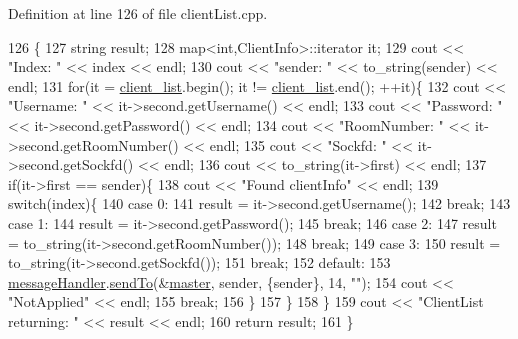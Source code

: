 Definition at line 126 of file client\+List.\+cpp.


\begin{DoxyCode}
126                                                      \{
127     \textcolor{keywordtype}{string} result;
128     map<int,ClientInfo>::iterator it;
129     cout << \textcolor{stringliteral}{"Index: "} << index << endl;
130     cout << \textcolor{stringliteral}{"sender: "} << to\_string(sender) << endl;
131     \textcolor{keywordflow}{for}(it = \hyperlink{class_client_list_a53c73362bff032aa6fceab4b8b5b39de}{client\_list}.begin(); it != \hyperlink{class_client_list_a53c73362bff032aa6fceab4b8b5b39de}{client\_list}.end(); ++it)\{
132         cout << \textcolor{stringliteral}{"Username: "} << it->second.getUsername() << endl;
133         cout << \textcolor{stringliteral}{"Password: "} << it->second.getPassword() << endl;
134         cout << \textcolor{stringliteral}{"RoomNumber: "} << it->second.getRoomNumber() << endl;
135         cout << \textcolor{stringliteral}{"Sockfd: "} << it->second.getSockfd() << endl;
136         cout << to\_string(it->first) << endl;
137         \textcolor{keywordflow}{if}(it->first == sender)\{
138             cout << \textcolor{stringliteral}{"Found clientInfo"} << endl;
139             \textcolor{keywordflow}{switch}(index)\{
140                 \textcolor{keywordflow}{case} 0:
141                     result = it->second.getUsername();
142                     \textcolor{keywordflow}{break};
143                 \textcolor{keywordflow}{case} 1:
144                     result = it->second.getPassword();
145                     \textcolor{keywordflow}{break};  
146                 \textcolor{keywordflow}{case} 2:
147                     result = to\_string(it->second.getRoomNumber());
148                     \textcolor{keywordflow}{break};
149                 \textcolor{keywordflow}{case} 3:
150                     result = to\_string(it->second.getSockfd());
151                     \textcolor{keywordflow}{break};
152                 \textcolor{keywordflow}{default}:
153                     \hyperlink{class_client_list_a15fd10297f79e0d1278d3b106c715390}{messageHandler}.\hyperlink{class_message_handler_a81dd916f61ef7f19d10cd3adee55bda9}{sendTo}(&\hyperlink{class_client_list_a819f5455b1afa484d846d5b6ef4209a7}{master}, sender, \{sender\}, 14, \textcolor{stringliteral}{""});
154                     cout << \textcolor{stringliteral}{"NotApplied"} << endl;
155                     \textcolor{keywordflow}{break};
156             \}
157         \}
158     \}
159     cout << \textcolor{stringliteral}{"ClientList returning: "} << result << endl;
160     \textcolor{keywordflow}{return} result;
161 \}
\end{DoxyCode}
